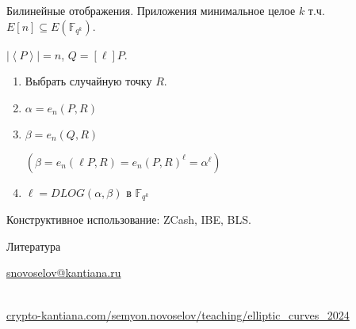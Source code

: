 \documentclass{beamer}
\begin{document}

\begin{frame}{Билинейные отображения. Приложения}
 минимальное целое $k$ т.ч. {\small $E[n] \subseteq E(\mathbb{F}_{q^k})$}.

\vspace{1em}

 $|\left<P\right>| = n$, $Q = [\ell] P$.
    \begin{enumerate}
        \item Выбрать случайную точку $R$.
        \item $\alpha = e_n(P, R)$
        \item $\beta  = e_n(Q, R)$ \hfill 
        \begin{scriptsize}
        $(\beta = e_n(\ell P, R) = e_n(P, R)^\ell = \alpha^\ell)$
        \end{scriptsize}
        \item $\ell = DLOG(\alpha, \beta)$ в $\mathbb{F}_{q^k}$
    \end{enumerate}    

\vspace{1em}
Конструктивное использование: ZCash, IBE, BLS.
\end{frame}


%


\begin{frame}{Литература}
\nocite{Menezes1993}\nocite{Blake1999}\nocite{Washington2008}
\renewcommand*{\bibfont}{\scriptsize}
\printbibliography


\begin{center}
    \begin{tcolorbox}[enhanced,hbox,colback=block-green-color-bg,colframe=subsection-color!120,title=Контакты,center title]
        \begin{varwidth}{\textwidth}
            \begin{center}
                \href{mailto:snovoselov@kantiana.ru}{snovoselov@kantiana.ru}
            \end{center}
        \end{varwidth}
    \end{tcolorbox}	
\end{center}

\\
{\footnotesize
    \href{https://crypto-kantiana.com/semyon.novoselov/teaching/elliptic_curves_2024}{crypto-kantiana.com/semyon.novoselov/teaching/elliptic\_curves\_2024}
}
\end{frame}
\end{document}
